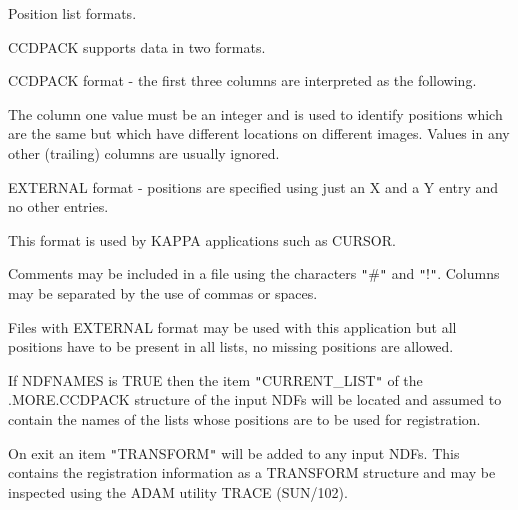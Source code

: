 {{{         \sstitem
         Position list formats.

      }
        CCDPACK supports data in two formats.

        CCDPACK format - the first three columns are interpreted as the
        following.

        The column one value must be an integer and is used to identify
        positions which are the same but which have different locations
        on different images. Values in any other (trailing) columns are
        usually ignored.

        EXTERNAL format - positions are specified using just an X and
        a Y entry and no other entries.

        This format is used by KAPPA applications such as CURSOR.

        Comments may be included in a file using the characters {\tt "}\#{\tt "} and
        {\tt "}!{\tt "}. Columns may be separated by the use of commas or spaces.

        Files with EXTERNAL format may be used with this application but
        all positions have to be present in all lists, no missing
        positions are allowed.

        If NDFNAMES is TRUE then the item {\tt "}CURRENT\_LIST{\tt "} of the
        .MORE.CCDPACK structure of the input NDFs will be located
        and assumed to contain the names of the lists whose positions
        are to be used for registration.

        On exit an item {\tt "}TRANSFORM{\tt "} will be added to any input NDFs.
        This contains the registration information as a TRANSFORM
        structure and may be inspected using the ADAM utility TRACE
        (SUN/102).
   }
   }
